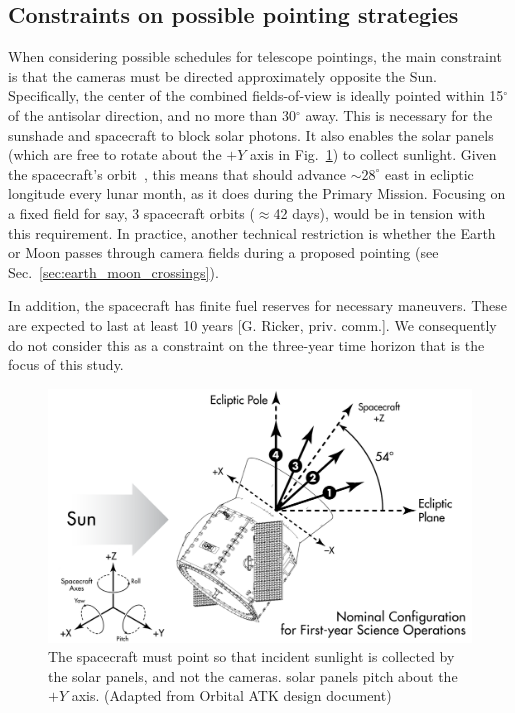\subsection{Constraints on possible pointing strategies}
\label{sec:constraints_on_pointings}

When considering possible schedules for telescope pointings, the main
constraint is that the cameras must be directed approximately opposite
the Sun.  Specifically, the center of the combined fields-of-view is
ideally pointed within 15$^\circ$ of the antisolar direction, and no
more than 30$^\circ$ away.
This is necessary for the sunshade and spacecraft to block solar
photons.  It also enables the solar panels (which are free to rotate
about the $+Y$ axis in Fig.~\ref{fig:spacecraft_angles}) to collect
sunlight.  Given the spacecraft's orbit~\citep{gangestad_high_2013},
this means that \tess should advance $\sim28^\circ$ east in ecliptic
longitude every lunar month, as it does during the Primary Mission.
Focusing on a fixed field for say, 3 spacecraft orbits ($\approx$42
days), would be in tension with this requirement.  In practice,
another technical restriction is whether the Earth or Moon passes
through \tesss camera fields during a proposed pointing (see
Sec.~\ref{sec:earth_moon_crossings}).

In addition, the spacecraft has finite fuel reserves for necessary maneuvers.
These are expected to last at least 10 years [G. Ricker, priv. comm.]. We 
consequently do not consider this as a constraint on the three-year time 
horizon that is the focus of this study.

\begin{figure}[!b]
	\centering
	\includegraphics{figures/spacecraft_angles.pdf}
	\caption{The spacecraft must point so that incident sunlight is collected 
		by the solar panels, and not the cameras. \tesss solar panels pitch 
		about the $+Y$ axis. (Adapted from Orbital ATK design document) }
	\label{fig:spacecraft_angles}
\end{figure}
